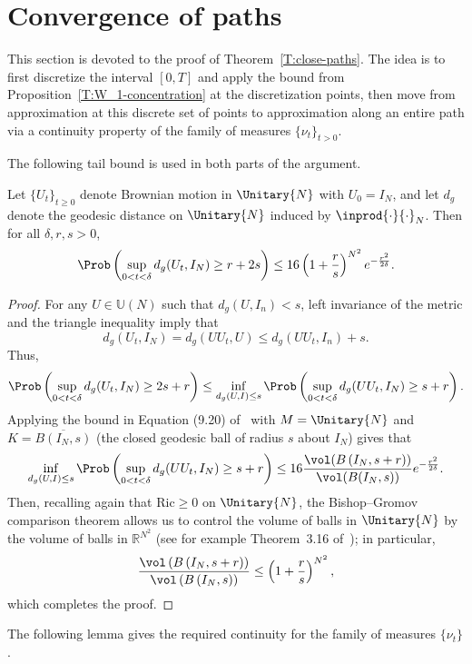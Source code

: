\section{Convergence of paths}\label{s.paths}
This section is devoted to the proof of Theorem~\ref{T:close-paths}. The idea is to first discretize the interval $[0,T]$ and apply the bound from Proposition~\ref{T:W_1-concentration} at the discretization points, then move from approximation at this discrete set of points to approximation along an entire path via a continuity property of the family of measures $\{\nu_t\}_{t>0}$.

The following tail bound is used in both parts of the argument.

\begin{prop}\label{T:BM-tail}
Let $\{U_t\}_{t\ge 0}$ denote Brownian motion in $\Unitary{N}$ with $U_0=I_N$, and let $d_g$ denote the geodesic distance on $\Unitary{N}$ induced by $\inprod{\cdot}{\cdot}_N$. Then for all $\delta,r,s>0$,
\[
\Prob\left(\sup_{0<t<\delta}d_g(U_t,I_N)\ge r+2s\right)\le 16\left(1+\frac{r}{s}\right)^{N^2}e^{-\frac{r^2}{2\delta}}.
\]
\end{prop}

\begin{proof}
For any $U\in\mathbb{U}(N)$ such that $d_g(U,I_n)<s$, left invariance of the metric and the triangle inequality imply that
\[
d_g(U_t,I_N)=d_g(UU_t,U)\le d_g(UU_t,I_n)+s.
\]
Thus,
\begin{align*}
\Prob\left(\sup_{0<t<\delta}d_g(U_t,I_N)\ge 2s+r\right) \le
\inf_{d_g(U,I)\le s}\Prob\left(\sup_{0<t<\delta}d_g(UU_t,I_N)\ge s+r\right).
\end{align*}
Applying the bound in Equation (9.20) of~\cite{Grigoryan1999} with $M=\Unitary{N}$ and $K=\overline{B\left(I_N,s\right)}$ (the closed geodesic ball of radius $s$ about $I_N$) gives that
\[
\inf_{d_g(U,I)\le s}\Prob\left(\sup_{0<t<\delta}d_g(UU_t,I_N)\ge s+r\right)\le16\frac{\vol(B\left(I_N,s+r\right))}{\vol(B(I_N,s))}e^{-\frac{r^2}{2\delta}}.
\]
Then, recalling again that $\mathrm{Ric}\ge0$ on $\Unitary{N}$, the Bishop--Gromov comparison theorem allows us to control the volume of balls in $\Unitary{N}$ by the volume of balls in $\mathbb{R}^{N^2}$ (see for example Theorem~3.16 of~\cite{Grove1987}); in particular,
\[
\frac{\vol\left(B\left(I_N,s+r\right)\right)}{\vol\left(B\left(I_N,s\right)\right)}\le
\left(1+\frac{r}{s}\right)^{N^2},
\]
which completes the proof.
\end{proof}

The following lemma gives the required continuity for the family of measures $\{\nu_t\}$.

